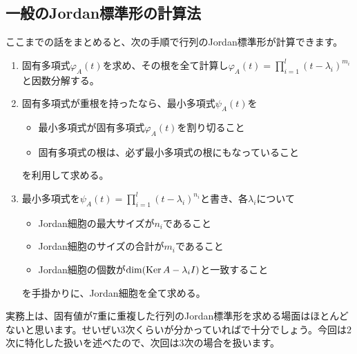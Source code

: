 \subsection{一般のJordan標準形の計算法}

ここまでの話をまとめると、次の手順で行列のJordan標準形が計算できます。
\begin{enumerate}
\item 固有多項式$\varphi_A(t)$を求め、その根を全て計算し$\varphi_A(t) = \prod_{i = 1}^l (t - \lambda_i)^{m_i}$と因数分解する。
\item 固有多項式が重根を持ったなら、最小多項式$\psi_A(t)$を
\begin{itemize}
\item 最小多項式が固有多項式$\varphi_A(t)$を割り切ること
\item 固有多項式の根は、必ず最小多項式の根にもなっていること
\end{itemize}
を利用して求める。
\item 最小多項式を$\psi_A(t) = \prod_{i = 1}^l (t - \lambda_i)^{n_i}$と書き、各$\lambda_i$について
\begin{itemize}
\item Jordan細胞の最大サイズが$n_i$であること
\item Jordan細胞のサイズの合計が$m_i$であること
\item Jordan細胞の個数が$\dim (\operatorname{Ker} A - \lambda_i I)$と一致すること
\end{itemize}
を手掛かりに、Jordan細胞を全て求める。
\end{enumerate}

実務上は、固有値が$7$重に重複した行列のJordan標準形を求める場面はほとんどないと思います。せいぜい$3$次くらいが分かっていればで十分でしょう。今回は$2$次に特化した扱いを述べたので、次回は$3$次の場合を扱います。

